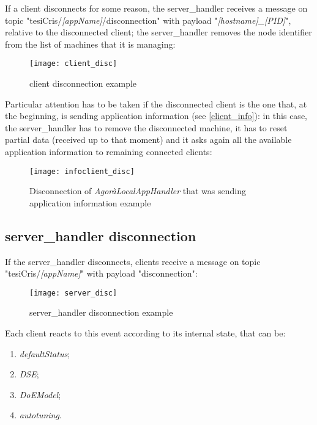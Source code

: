 If a client disconnects for some reason, the server\_handler receives a message on topic "tesiCris\slash{}\textit{[appName]}\slash{}disconnection" with payload "\textit{[hostname]\_[PID]}", relative to the disconnected client; the ser\-ver\_han\-dler removes the node identifier from the list of machines that it is managing:

\begin{figure}[H]

    \centering
    \texttt{[image: client\_disc]}
    \caption{client disconnection example}
    
\end{figure}

Particular attention has to be taken if the disconnected client is the one that, at the beginning, is sending application information (see \ref{client_info}): in this case, the server\_handler has to remove the disconnected machine, it has to reset partial data (received up to that moment) and it asks again all the available application information to remaining connected clients:

\begin{figure}[H]

    \centering
    \texttt{[image: infoclient\_disc]}
    \caption{Disconnection of \textit{AgoràLocalAppHandler} that was sending application information example}
    
\end{figure}





\subsection{server\_handler disconnection}\label{handler_disc}

If the server\_handler disconnects, clients receive a message on topic "tesiCris\slash{}\textit{[appName]}" with payload "disconnection":

\begin{figure}[H]

    \centering
    \texttt{[image: server\_disc]}
    \caption{server\_handler disconnection example}
    
\end{figure}

Each client reacts to this event according to its internal state, that can be:

\begin{enumerate}

    \item \textit{defaultStatus};
    
    \item \textit{DSE};
    
    \item \textit{DoEModel};
    
    \item \textit{autotuning}.

\end{enumerate}


